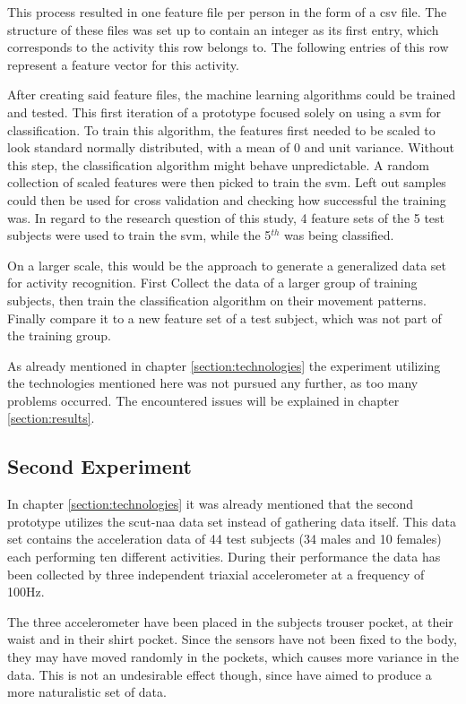 This process resulted in one feature file per person in the form of a \gls{csv} file. The structure of these files was set up to contain an integer as its first entry, which corresponds to the activity this row belongs to. The following entries of this row represent a feature vector for this activity.

After creating said feature files, the machine learning algorithms could be trained and tested. This first iteration of a prototype focused solely on using a \gls{svm} for classification. To train this algorithm, the features first needed to be scaled to look standard normally distributed, with a mean of 0 and unit variance. Without this step, the classification algorithm might behave unpredictable. A random collection of scaled features were then picked to train the \gls{svm}. Left out samples could then be used for cross validation and checking how successful the training was. In regard to the research question of this study, 4 feature sets of the 5 test subjects were used to train the \gls{svm}, while the 5$^{th}$ was being classified.

On a larger scale, this would be the approach to generate a generalized data set for activity recognition. First Collect the data of a larger group of training subjects, then train the classification algorithm on their movement patterns. Finally compare it to a new feature set of a test subject, which was not part of the training group.

As already mentioned in chapter \ref{section:technologies} the experiment utilizing the technologies mentioned here was not pursued any further, as too many problems occurred. The encountered issues will be explained in chapter \ref{section:results}.


\subsection{Second Experiment}
In chapter \ref{section:technologies} it was already mentioned that the second prototype utilizes the \gls{scut-naa} data set instead of gathering data itself. This data set contains the acceleration data of 44 test subjects (34 males and 10 females) each performing ten different activities. During their performance the data has been collected by three independent triaxial accelerometer at a frequency of 100Hz.

The three accelerometer have been placed in the subjects trouser pocket, at their waist and in their shirt pocket. Since the sensors have not been fixed to the body, they may have moved randomly in the pockets, which causes more variance in the data. This is not an undesirable effect though, since \textcite[]{xue2010naturalistic} have aimed to produce a more naturalistic set of data.

